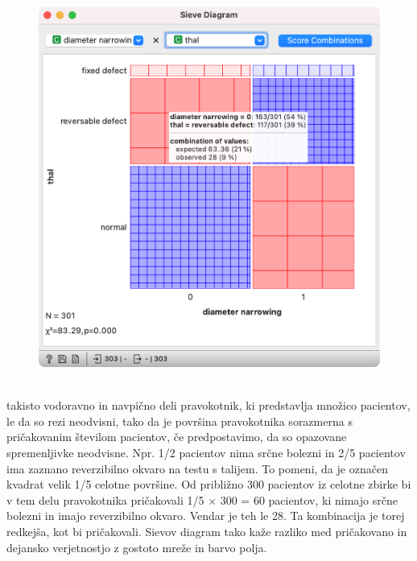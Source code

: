 \begin{figure}
    \includegraphics[scale=0.5]{sieve-diagram.png}
    \caption{$\;$}
\end{figure}

 takisto vodoravno in navpično deli pravokotnik, ki predstavlja množico pacientov, le da so rezi neodvisni, tako da je površina pravokotnika sorazmerna s pričakovanim številom pacientov, če predpostavimo, da so opazovane spremenljivke neodvisne. Npr.  1/2 pacientov nima srčne bolezni in 2/5 pacientov ima zaznano reverzibilno okvaro na testu s talijem. To pomeni, da je označen kvadrat velik 1/5 celotne površine. Od približno 300 pacientov iz celotne zbirke bi v tem delu pravokotnika pričakovali 1/5 × 300 = 60 pacientov, ki nimajo srčne bolezni in imajo reverzibilno okvaro. Vendar je teh le 28. Ta kombinacija je torej redkejša, kot bi pričakovali. Sievov diagram tako kaže razliko med pričakovano in dejansko verjetnostjo z gostoto mreže in barvo polja.